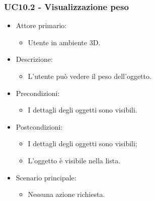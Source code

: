 \subsubsection{UC10.2 - Visualizzazione peso}
\begin{itemize}

	\item Attore primario: 
	\begin{itemize}
		\item Utente in ambiente 3D.
	\end{itemize}
	\item Descrizione:
	\begin{itemize}
		\item L'utente può vedere il peso dell'oggetto.
	\end{itemize}
	
	\item Precondizioni:
	\begin{itemize}
		\item I dettagli degli oggetti sono visibili.
	\end{itemize}
	
	\item Postcondizioni:
	\begin{itemize}
		\item  I dettagli degli oggetti sono visibili;
		\item L'oggetto è visibile nella lista.
	\end{itemize}
	
	\item Scenario principale:
	\begin{itemize}
		\item Nessuna azione richiesta.
	\end{itemize}
	
\end{itemize}

